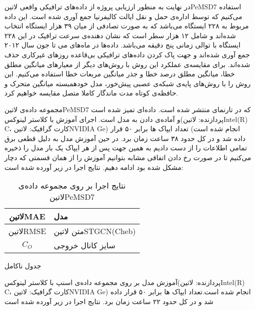 
در نهایت به منظور ارزیابی پروژه از داده‌های ترافیکی واقعی ‌لاتین{PeMSD7} استفاده می‌کنیم که توسط اداره‌ی حمل و نقل ایالت کالیفرنیا جمع آوری شده است.
این داده مربوط به ۲۲۸ ایستگاه می‌باشد که به صورت تصادفی از میان ۳۹ هزار ایستگاه‌ انتخاب شده‌اند و شامل ۱۲ هزار سطر است که نشان دهنده‌ی سرعت ترافیک در این ۲۲۸ ایستگاه با توالی زمانی پنج دقیقه می‌باشد.
داده‌ها در ماه‌های می تا جون سال ۲۰۱۲ جمع آوری شده‌اند و جهت پاک کردن داده‌های ترافیکی بی‌قاعده روزهای غیرکاری حذف شده‌اند.
برای مقایسه‌ی عملکرد این روش با روش‌های دیگر از معیارهای میانگین مطلق خطا، میانگین مطلق درصد خطا و جذر میانگین مربعات خطا استفاده می‌کنیم.
این روش را با روش‌های پایه‌ی شبکه‌ی عصبی پیش‌خور، مدل خودهمبسته میانگین متحرک و حافظه‌ی کوتاه مدت ماندگار کاملا متصل  مقایسه خواهیم کرد.

مجموعه داده‌ی ‌لاتین{PeMSD7} که در تارنمای  منتشر شده است. داده‌ای تمیز شده است و آماده‌ی دادن به مدل است. اجرای آموزش با کلاستر لینوکس(پردازنده: ‌لاتین{Intel(R) C}، کارت گرافیک: ‌لاتین{NVIDIA Ge}) انجام شده است)
تعداد ایپاک ها برابر ۵۰ قرار داده شد و در کل حدود ۳۸ ساعت زمان برد.
در حین آموزش مدل به دلیل قطعی برق تمامی اطلاعات را از دست دادیم به همین جهت پس از هر ایپاک یک بار مدل را ذخیره می‌کنیم تا در صورت رخ دادن اتفاقی مشابه بتوانیم آموزش را از همان قسمتی که دچار مشکل شده بود ادامه دهیم. نتایج اجرا در زیر آورده شده است:

\begin{table}[h]
  \centering
  \caption{نتایج اجرا بر روی مجموعه داده‌ی  لاتین{PeMSD7}}
  \begin{tabular}{|c|p{}|}
    \hline
     لاتین{MAE} & مدل \\
    \hline
     لاتین{RMSE} & متن لاتین{STGCN(Cheb)} \\
     $C_{O}$ & سایز کانال خروجی \\
    \hline
  \end{tabular}
  \label{tbl:distance}
\end{table}


جدول ناکامل

آموزش مدل بر روی مجموعه داده‌ی اسنپ با کلاستر لینوکس(پردازنده: ‌لاتین{Intel(R) C}، کارت گرافیک: ‌لاتین{NVIDIA Ge}) انجام شده است.تعداد ایپاک ها برابر ۵۰ قرار داده شد و در کل حدود ۲۲ ساعت زمان برد. نتایج اجرا در زیر آورده شده است


